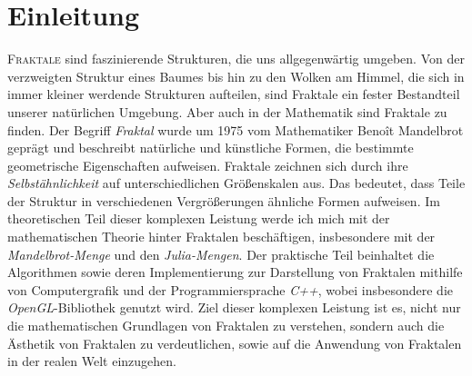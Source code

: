 \chapter*{Einleitung}

%

\lettrine{F}{raktale} sind faszinierende Strukturen, die uns allgegenwärtig umgeben.
Von der verzweigten Struktur eines Baumes bis hin zu den Wolken am Himmel, die sich in immer kleiner werdende Strukturen aufteilen, sind Fraktale ein fester Bestandteil unserer natürlichen Umgebung.
Aber auch in der Mathematik sind Fraktale zu finden. \newline
Der Begriff \textit{Fraktal} wurde um 1975 vom Mathematiker Benoît Mandelbrot geprägt \cite{dewiki:238550386} und beschreibt natürliche und künstliche Formen, die bestimmte geometrische Eigenschaften aufweisen. \newline
Fraktale zeichnen sich durch ihre \textit{Selbstähnlichkeit} auf unterschiedlichen Größenskalen aus. Das bedeutet, dass Teile der Struktur in verschiedenen Vergrößerungen ähnliche Formen aufweisen. \newline
\hfill \break
Im theoretischen Teil dieser komplexen Leistung werde ich mich mit der mathematischen Theorie hinter Fraktalen beschäftigen, insbesondere mit der \textit{Mandelbrot-Menge} und den \textit{Julia-Mengen}. \newline
Der praktische Teil beinhaltet die Algorithmen sowie deren Implementierung zur Darstellung von Fraktalen mithilfe von Computergrafik und der Programmiersprache \textit{C++}, wobei insbesondere die \textit{OpenGL}-Bibliothek genutzt wird. \newline
\hfill \break
Ziel dieser komplexen Leistung ist es, nicht nur die mathematischen Grundlagen von Fraktalen zu verstehen, sondern auch die Ästhetik von Fraktalen zu verdeutlichen, sowie auf die Anwendung von Fraktalen in der realen Welt einzugehen.